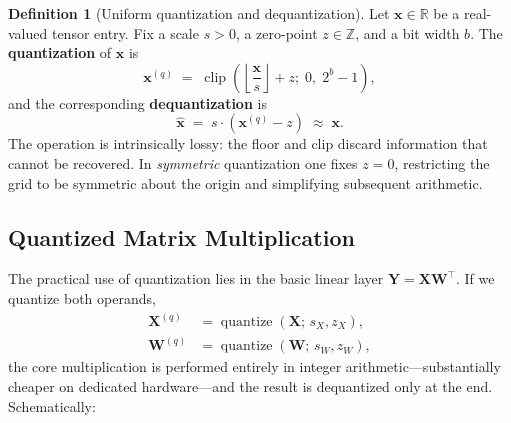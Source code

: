 \documentclass[11pt,a4paper]{article}
\theoremstyle{definition}
\newtheorem{definition}{Definition}[section]
\theoremstyle{remark}
\theoremstyle{plain}
\newcommand{\R}{\mathbb{R}}
\newcommand{\clip}{\operatorname{clip}}
\begin{document}
\begin{definition}[Uniform quantization and dequantization]
Let $\mathbf{x} \in \R$ be a real-valued tensor entry. Fix a scale
$s > 0$, a zero-point $z \in \mathbb{Z}$, and a bit width $b$. The
\textbf{quantization} of $\mathbf{x}$ is
\begin{equation}
  \mathbf{x}^{(q)} \;=\; \clip\!\left(\left\lfloor \frac{\mathbf{x}}{s} \right\rfloor + z;\; 0,\; 2^b - 1\right),
  \label{eq:quant}
\end{equation}
and the corresponding \textbf{dequantization} is
\begin{equation}
  \hat{\mathbf{x}} \;=\; s \cdot (\mathbf{x}^{(q)} - z) \;\approx\; \mathbf{x}.
  \label{eq:dequant}
\end{equation}
The operation is intrinsically lossy: the floor and clip discard
information that cannot be recovered. In \emph{symmetric} quantization one
fixes $z = 0$, restricting the grid to be symmetric about the origin and
simplifying subsequent arithmetic.
\end{definition}

\subsection{Quantized Matrix Multiplication}

The practical use of quantization lies in the basic linear layer
$\mathbf{Y} = \mathbf{X}\mathbf{W}^\top$. If we quantize both operands,
\begin{align}
  \mathbf{X}^{(q)} &= \operatorname{quantize}(\mathbf{X};\, s_X, z_X), \\
  \mathbf{W}^{(q)} &= \operatorname{quantize}(\mathbf{W};\, s_W, z_W),
\end{align}
the core multiplication is performed entirely in integer
arithmetic---substantially cheaper on dedicated hardware---and the result
is dequantized only at the end. Schematically:

\begin{center}
\end{center}
\end{document}
